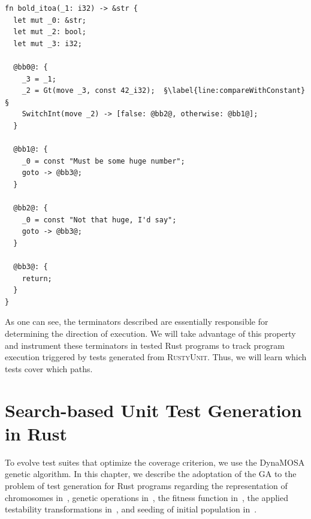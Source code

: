 \documentclass[paper=a4,%
  twoside,%
  BCOR4mm,%
  abstract=true,%
  toc=bibliography,%
  chapterprefix=true,%
  toc=bibliographynumbered,%
  open=right,%
  english,%
  pagesize=pdftex]{scrreprt}
\newcommand{\tech}{\textsc{RustyUnit}\xspace}
\newcommand{\mir}{\ac{MIR}\xspace}
\begin{document}
\begin{lstlisting}[language={MIR}, style=boxed, escapechar=§, caption={\mir of the \texttt{bold\string_itoa} function}, label=lst:mir-lowered-second]
fn bold_itoa(_1: i32) -> &str {
  let mut _0: &str;
  let mut _2: bool;
  let mut _3: i32;

  @bb0@: {
    _3 = _1;
    _2 = Gt(move _3, const 42_i32);  §\label{line:compareWithConstant}§
    SwitchInt(move _2) -> [false: @bb2@, otherwise: @bb1@];
  }

  @bb1@: {
    _0 = const "Must be some huge number";
    goto -> @bb3@;
  }

  @bb2@: {
    _0 = const "Not that huge, I'd say";
    goto -> @bb3@;
  }

  @bb3@: {
    return;
  }
}
\end{lstlisting}

As one can see, the terminators described are essentially responsible for determining the direction of execution. We will take advantage of this property and instrument these terminators in tested Rust programs to track program execution triggered by tests generated from \tech. Thus, we will learn which tests cover which paths.

\clearpage
\chapter{Search-based Unit Test Generation in Rust}
\label{chap:sbst-in-rust}
To evolve test suites that optimize the coverage criterion, we use the DynaMOSA genetic algorithm. In this chapter, we describe the adoptation of the \ac{GA} to the problem of test generation for Rust programs regarding the representation of chromosomes in~, genetic operations in~, the fitness function in~, the applied testability transformations in~, and seeding of initial population in~.
\end{document}
